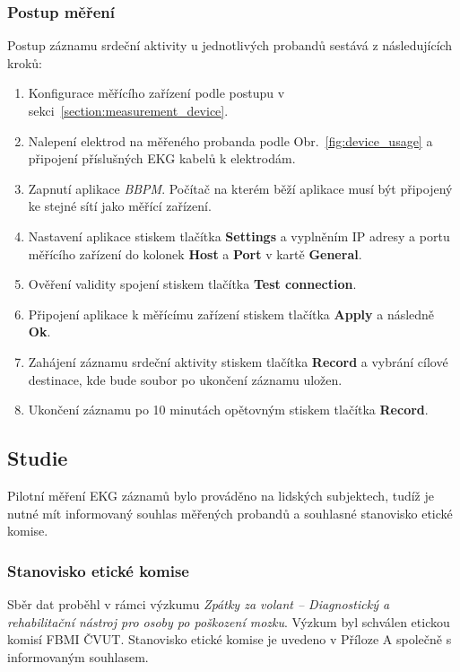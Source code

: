 \subsubsection{Postup měření}
\label{section:measurement_process}
Postup záznamu srdeční aktivity u jednotlivých probandů sestává z
následujících kroků:
\begin{enumerate}
    \item Konfigurace měřícího zařízení podle postupu v sekci~\ref{section:measurement_device}.
    \item Nalepení elektrod na měřeného probanda podle
          Obr.~\ref{fig:device_usage} a připojení příslušných EKG kabelů k elektrodám.
    \item Zapnutí aplikace \textit{BBPM}. Počítač na kterém běží aplikace musí
          být připojený ke stejné sítí jako měřící zařízení.
    \item Nastavení aplikace stiskem tlačítka \textbf{Settings} a vyplněním IP
          adresy a portu měřícího zařízení do kolonek \textbf{Host} a \textbf{Port} v
          kartě \textbf{General}.
    \item Ověření validity spojení stiskem tlačítka \textbf{Test connection}.
    \item Připojení aplikace k měřícímu zařízení stiskem tlačítka
          \textbf{Apply} a následně \textbf{Ok}.
    \item Zahájení záznamu srdeční aktivity stiskem tlačítka \textbf{Record} a
          vybrání cílové destinace, kde bude soubor po ukončení záznamu uložen.
    \item Ukončení záznamu po 10 minutách opětovným stiskem tlačítka \textbf{Record}.
\end{enumerate}

\subsection{Studie}
\label{section:study}
Pilotní měření EKG záznamů bylo prováděno na lidských subjektech, tudíž je nutné
mít informovaný souhlas měřených probandů a souhlasné stanovisko etické komise.

\subsubsection{Stanovisko etické komise}
Sběr dat proběhl v rámci výzkumu \textit{Zpátky za volant -- Diagnostický a
rehabilitační nástroj pro osoby po poškození mozku}. Výzkum byl schválen etickou
komisí FBMI ČVUT. Stanovisko etické komise je uvedeno v Příloze
A společně s informovaným souhlasem.

